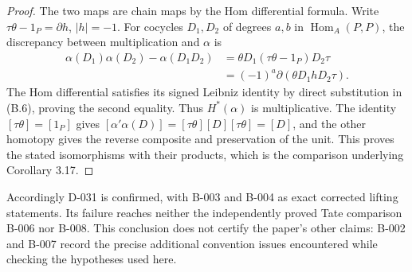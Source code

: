 \begin{proof}
The two maps are chain maps by the Hom differential formula.
Write $\tau\theta-1_P=\partial h$, $|h|=-1$.
For cocycles $D_1,D_2$ of degrees $a,b$ in $\operatorname{Hom}_A(P,P)$,
the discrepancy between multiplication and $\alpha$ is
\[
\begin{split}
\alpha(D_1)\alpha(D_2)-\alpha(D_1D_2)
 &=\theta D_1(\tau\theta-1_P)D_2\tau\\
 &=(-1)^a\partial(\theta D_1hD_2\tau).
\end{split}
\]
The Hom differential satisfies its signed Leibniz identity by direct
substitution in \textup{(B.6)}, proving the second equality.
Thus $H^*(\alpha)$ is multiplicative.  The identity
$[\tau\theta]=[1_P]$ gives
$[\alpha'\alpha(D)]=[\tau\theta][D][\tau\theta]=[D]$,
and the other homotopy gives the reverse composite and preservation
of the unit.  This proves the stated isomorphisms with their products,
which is the comparison underlying Corollary 3.17.
\end{proof}

Accordingly D-031 is confirmed, with B-003 and B-004 as exact corrected
lifting statements.  Its failure reaches neither the independently
proved Tate comparison B-006 nor B-008.  This conclusion does not certify
the paper's other claims: B-002 and B-007 record the precise additional
convention issues encountered while checking the hypotheses used here.
